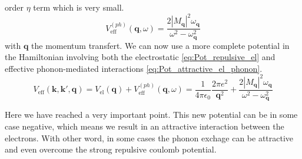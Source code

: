 \documentclass[../main.tex]{subfile}
\begin{document}
order $\eta$ term which is very small. 
\begin{equation}\label{eq:Pot_attractive_el_phonon}
    V^{(ph)}_{\text{eff}}(\bm{q},\omega) = \frac{2|M_{\bm{q}}|^2\omega_{\bm{q}}}{\omega^2 - \omega_{\bm{q}}^2}
\end{equation}
with $\bm{q}$ the momentum transfert. 
We can now use a more complete potential in the Hamiltonian involving both the electrostatic \ref{eq:Pot_repulsive_el} and effective phonon-mediated interactions \ref{eq:Pot_attractive_el_phonon}.
\begin{equation}
    V_{\text{eff}}(\bm{k},\bm{k}',\bm{q}) =  V_{\text{el}}(\bm{q}) + V^{(ph)}_{\text{eff}}(\bm{q},\omega) \label{eq:V_eff} = \frac{1}{4\pi\epsilon_0} \frac{2\pi e^2}{\bm{q}^2} + \frac{2|M_{\bm{q}}|^2\omega_{\bm{q}}}{\omega^2 - \omega_{\bm{q}}^2}
\end{equation}

Here we have reached a very important point. This new potential can be in some case negative, which means we result in an attractive interaction between the electrons. 
With other word, in some cases the phonon exchage can be attractive and even overcome the strong repulsive coulomb potential.
\end{document}
